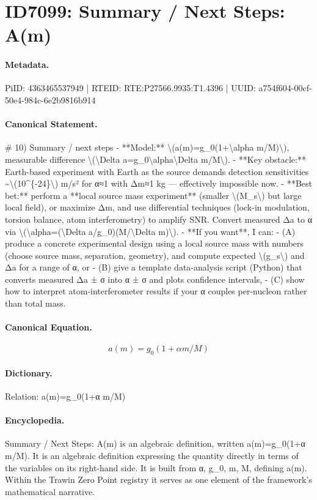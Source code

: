 \section*{ID7099: Summary / Next Steps: A(m)}
\paragraph{Metadata.}
PiID: 4363465537949 | RTEID: RTE:P27566.9935:T1.4396 | UUID: a754f604-00cf-50e4-984c-6e2b9816b914

\paragraph{Canonical Statement.}
\# 10) Summary / next steps - **Model:** \textbackslash{}(a(m)=g\_0(1+\textbackslash{}alpha m/M)\textbackslash{}), measurable difference \textbackslash{}(\textbackslash{}Delta a=g\_0\textbackslash{}alpha\textbackslash{}Delta m/M\textbackslash{}). - **Key obstacle:** Earth-based experiment with Earth as the source demands detection sensitivities \textasciitilde{}\textbackslash{}(10\textasciicircum{}\{-24\}\textbackslash{}) m/s² for α≈1 with Δm≈1 kg — effectively impossible now. - **Best bet:** perform a **local source mass experiment** (smaller \textbackslash{}(M\_s\textbackslash{}) but large local field), or maximize Δm, and use differential techniques (lock-in modulation, torsion balance, atom interferometry) to amplify SNR. Convert measured Δa to α via \textbackslash{}(\textbackslash{}alpha=(\textbackslash{}Delta a/g\_0)(M/\textbackslash{}Delta m)\textbackslash{}). - **If you want**, I can: - (A) produce a concrete experimental design using a local source mass with numbers (choose source mass, separation, geometry), and compute expected \textbackslash{}(g\_s\textbackslash{}) and Δa for a range of α, or - (B) give a template data-analysis script (Python) that converts measured Δa ± σ into α ± σ and plots confidence intervals, - (C) show how to interpret atom-interferometer results if your α couples per-nucleon rather than total mass.

\paragraph{Canonical Equation.}
\[
a(m)=g_0(1+\alpha m/M)
\]

\paragraph{Dictionary.}
Relation: a(m)=g\_0(1+α m/M)

\paragraph{Encyclopedia.}
Summary / Next Steps: A(m) is an algebraic definition, written a(m)=g\_0(1+α m/M). It is an algebraic definition expressing the quantity directly in terms of the variables on its right-hand side. It is built from α, g\_0, m, M, defining a(m). Within the Trawin Zero Point registry it serves as one element of the framework's mathematical narrative.
